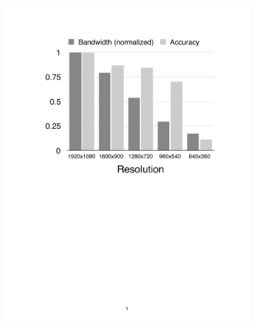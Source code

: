 \begin{figure}
  \centering
  \begin{subfigure}{.48\columnwidth}
    \centering
    \includegraphics[width=.95\linewidth]{figures/motiv-resolution.pdf}
    \label{fig:log-bw}
  \end{subfigure}
  \begin{subfigure}{.48\columnwidth}
    \centering

\end{subfigure}
\end{figure}

